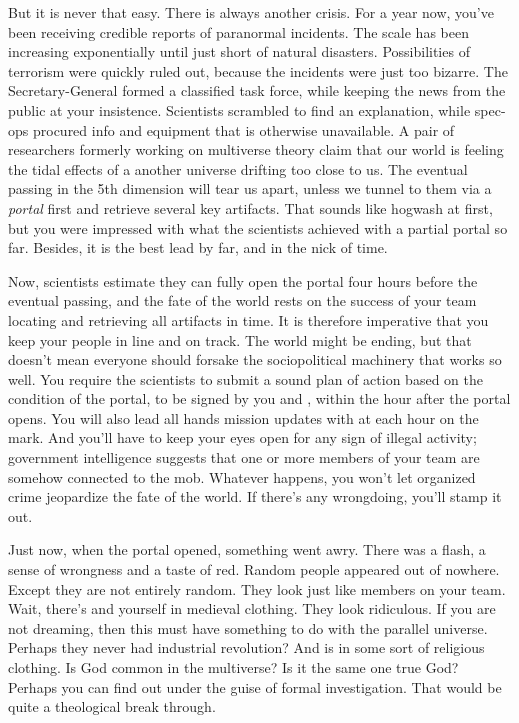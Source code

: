 \documentclass[char]{guildcamp3}
\begin{document}
But it is never that easy. There is always another crisis. For a year now, you've been receiving credible reports of paranormal incidents. The scale has been increasing exponentially until just short of natural disasters. Possibilities of terrorism were quickly ruled out, because the incidents were just too bizarre. The Secretary-General formed a classified task force, while keeping the news from the public at your insistence. Scientists scrambled to find an explanation, while spec-ops procured info and equipment that is otherwise unavailable. A pair of researchers formerly working on multiverse theory claim that our world is feeling the tidal effects of a another universe drifting too close to us. The eventual passing in the 5th dimension will tear us apart, unless we tunnel to them via a \emph{portal} first and retrieve several key artifacts. That sounds like hogwash at first, but you were impressed with what the scientists achieved with a partial portal so far. Besides, it is the best lead by far, and in the nick of time. 

Now, scientists estimate they can fully open the portal four hours before the eventual passing, and the fate of the world rests on the success of your team locating and retrieving all artifacts in time. It is therefore imperative that you keep your people in line and on track. The world might be ending, but that doesn't mean everyone should forsake the sociopolitical machinery that works so well. You require the scientists to submit a sound plan of action based on the condition of the portal, to be signed by you and \cPoliTwo{}, within the hour after the portal opens. You will also lead all hands mission updates with \cPoliTwo{} at each hour on the mark. And you'll have to keep your eyes open for any sign of illegal activity; government intelligence suggests that one or more members of your team are somehow connected to the mob. Whatever happens, you won't let organized crime jeopardize the fate of the world. If there's any wrongdoing, you'll stamp it out.

Just now, when the portal opened, something went awry. There was a flash, a sense of wrongness and a taste of red. Random people appeared out of nowhere. Except they are not entirely random. They look just like members on your team. Wait, there's \cPoliTwo{} and yourself in medieval clothing. They look ridiculous. If you are not dreaming, then this must have something to do with the parallel universe. Perhaps they never had industrial revolution? And \cTech{} is in some sort of religious clothing. Is God common in the multiverse? Is it the same one true God? Perhaps you can find out under the guise of formal investigation. That would be quite a theological break through.
\end{document}
